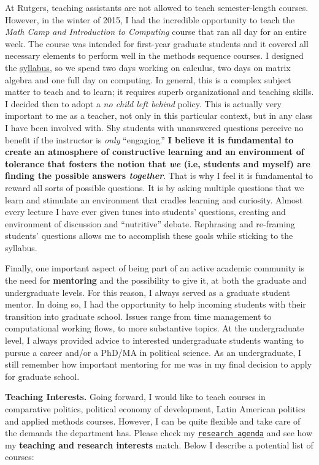 At Rutgers, teaching assistants are not allowed to teach semester-length courses. However, in the winter of 2015, I had the incredible opportunity to teach the \emph{Math Camp and Introduction to Computing} course that ran all day for an entire week. The course was intended for first-year graduate students and it covered all necessary elements to perform well in the methods sequence courses. I designed the \href{https://github.com/hbahamonde/Math-Camp/raw/master/Syllabus/Math_Camp_Syllabus.pdf}{syllabus}, so we spend two days working on calculus, two days on matrix algebra and one full day on computing. In general, this is a complex subject matter to teach and to learn; it requires superb organizational and teaching skills. I decided then to adopt a \emph{no child left behind} policy. This is actually very important to me as a teacher, not only in this particular context, but in any class I have been involved with. Shy students with unanswered questions perceive no benefit if the instructor is \emph{only} ``engaging.'' {\bf I believe it is fundamental to create an atmosphere of constructive learning and an environment of tolerance that fosters the notion that \emph{we} (i.e, students and myself) are finding the possible answers \emph{together}}. That is why I feel it is fundamental to reward all sorts of possible questions. It is by asking multiple questions that we learn and stimulate an environment that cradles learning and curiosity. Almost every lecture I have ever given tunes into students' questions, creating and environment of discussion and ``nutritive'' debate. Rephrasing and re-framing students' questions allows me to accomplish these goals while sticking to the syllabus. 

Finally, one important aspect of being part of an active academic community is the need for {\bf mentoring} and the possibility to give it, at both the graduate and undergraduate levels. For this reason, I always served as a graduate student mentor. In doing so, I had the opportunity to help incoming students with their transition into graduate school. Issues range from time management to computational working flows, to more substantive topics. At the undergraduate level, I always provided advice to interested undergraduate students wanting to pursue a career and/or a PhD/MA in political science. As an undergraduate, I still remember how important mentoring for me was in my final decision to apply for graduate school.

{\bf Teaching Interests.} Going forward, I would like to teach courses in comparative politics, political economy of development, Latin American politics and applied methods courses. However, I can be quite flexible and take care of the demands the department has. Please check my \href{http://www.hectorbahamonde.com/research/}{\texttt{research agenda}} and see how my {\bf teaching and research interests} match. Below I describe a potential list of courses:
